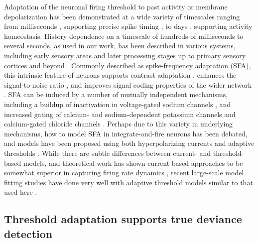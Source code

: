 \documentclass[10pt,letterpaper]{article}
\begin{document}
Adaptation of the neuronal firing threshold to past activity or membrane depolarization has been demonstrated at a wide variety of timescales ranging from milliseconds \cite{Henze2001-xd, Badel2008-ld, Higgs2011-cy}, supporting precise spike timing \cite{Azouz2000-vh, Huang2016-ch}, to days \cite{OLeary2010-ar}, supporting activity homeostasis. History dependence on a timescale of hundreds of milliseconds to several seconds, as used in our work, has been described in various systems, including early sensory areas \cite{Baccus2002-jb, Wark2009-sf} and later processing stages up to primary sensory cortices and beyond \cite{Spain1991-fg, Sanchez-Vives2000-df, Henze2001-xd, La_Camera2006-dz, Abolafia2011-ig}. Commonly described as spike-frequency adaptation (SFA), this intrinsic feature of neurons supports contrast adaptation \cite{Sanchez-Vives2000-df, Wang2003-vv}, enhances the signal-to-noise ratio \cite{Wark2007-rx, Chacron2007-ak}, and improves signal coding properties of the wider network \cite{Prescott2008-oa, Bohte2012-gk, Lee2023-bu}. SFA can be induced by a number of mutually independent mechanisms, including a buildup of inactivation in voltage-gated sodium channels \cite{Fleidervish1996-ly, Miles2005-nz}, and increased gating of calcium- and sodium-dependent potassium channels \cite{Madison1984-zc, Schwindt1989-lv, Sanchez-Vives2000-rv, Wang2003-vv, Faber2005-vc} and calcium-gated chloride channels \cite{Ha2016-lc, Ha2017-bh}. Perhaps due to this variety in underlying mechanisms, how to model SFA in integrate-and-fire neurons has been debated, and models have been proposed using both hyperpolarizing currents \cite{Izhikevich2003-ty, Brette2005-ci} and adaptive thresholds \cite{Segundo1968-eu, Chacron2003-oz, Kobayashi2009-av}. While there are subtle differences between current- and threshold-based models, and theoretical work has shown current-based approaches to be somewhat superior in capturing firing rate dynamics \cite{Liu2001-yw, Benda2010-tz}, recent large-scale model fitting studies have done very well with adaptive threshold models similar to that used here \cite{Pozzorini2015-ei, Teeter2018-iz}.

\subsection*{Threshold adaptation supports true deviance detection}
\end{document}
